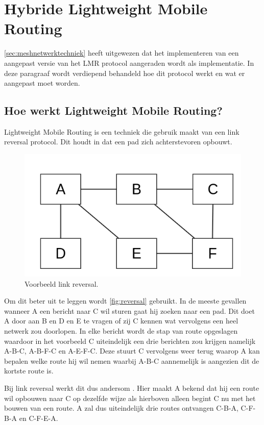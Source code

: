 \documentclass[a4paper, 11pt, oneside]{report}
\begin{document}
\section{Hybride Lightweight Mobile Routing}\label{sec:hybride-lightweight-mobile-routing}

\autoref{sec:meshnetwerktechniek} heeft uitgewezen dat het implementeren van een aangepast versie van het LMR protocol aangeraden wordt als implementatie. In deze paragraaf wordt verdiepend behandeld hoe dit protocol werkt en wat er aangepast moet worden.

\subsection{Hoe werkt Lightweight Mobile Routing?}

Lightweight Mobile Routing is een techniek die gebruik maakt van een link reversal protocol. Dit houdt in dat een pad zich achterstevoren opbouwt.
 
\begin{figure}[H]
	\begin{center}\includegraphics[width=0.45\linewidth]{Afbeeldingen/reversal.png}\end{center}
	\caption{Voorbeeld link reversal.}
	\label{fig:reversal}
\end{figure} 

Om dit beter uit te leggen wordt  \autoref{fig:reversal} gebruikt.
In de meeste gevallen wanneer A een bericht naar C wil sturen gaat hij zoeken naar een pad. 
Dit doet A door aan B en D  en E te vragen of zij C kennen wat vervolgens een heel netwerk zou doorlopen.
In elke bericht wordt de stap van route opgeslagen waardoor in het voorbeeld C uiteindelijk een drie berichten zou krijgen namelijk A-B-C, A-B-F-C en A-E-F-C. Deze stuurt C vervolgens weer terug waarop A kan bepalen welke route hij wil nemen waarbij A-B-C aannemelijk is aangezien dit de kortste route is. 

Bij link reversal werkt dit dus andersom \cite{Vainio_linkreversal}.
Hier maakt A bekend dat hij een route wil opbouwen naar C op dezelfde wijze als hierboven alleen begint C nu met het bouwen van een route. 
A zal dus uiteindelijk drie routes ontvangen C-B-A, C-F-B-A en C-F-E-A.
\end{document}
